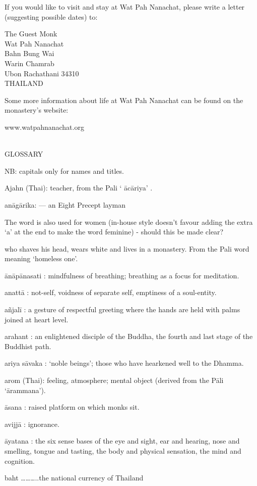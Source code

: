 If you would like to visit and stay at Wat Pah Nanachat, please write a
letter (suggesting possible dates) to:

The Guest Monk\\Wat Pah Nanachat\\Bahn Bung Wai\\Warin Chamrab\\Ubon
Rachathani 34310\\THAILAND

Some more information about life at Wat Pah Nanachat can be found on the
monastery's website:

www.watpahnanachat.org

\\ 

GLOSSARY

NB: capitals only for names and titles.

Ajahn (Thai): teacher, from the Pali ` ācāriya' .

anāgārika: --- an Eight Precept layman

The word is also used for women (in-house style doesn't favour adding
the extra `a' at the end to make the word feminine) - should this be
made clear?

who shaves his head, wears white and lives in a monastery. From the Pali
word meaning `homeless one'.

ānāpānasati : mindfulness of breathing; breathing as a focus for
meditation.

anattā : not-self, voidness of separate self, emptiness of a
soul-entity.

añjalī : a gesture of respectful greeting where the hands are held with
palms joined at heart level.

arahant : an enlightened disciple of the Buddha, the fourth and last
stage of the Buddhist path.

ariya sāvaka : `noble beings'; those who have hearkened well to the
Dhamma.

arom (Thai): feeling, atmosphere; mental object (derived from the Pāli
`ārammana').

āsana : raised platform on which monks sit.

avijjā : ignorance.

āyatana : the six sense bases of the eye and sight, ear and hearing,
nose and smelling, tongue and tasting, the body and physical sensation,
the mind and cognition.

baht \ldots{}\ldots{}\ldots{}..the national currency of Thailand

